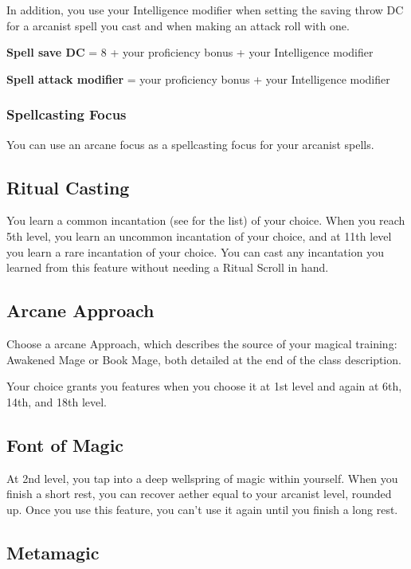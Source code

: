 In addition, you use your Intelligence modifier when setting the saving throw DC for a arcanist spell you cast and when making an attack roll with one.

\textbf{Spell save DC} = 8 + your proficiency bonus + your Intelligence modifier

\textbf{Spell attack modifier} = your proficiency bonus + your Intelligence modifier

\subsubsection{Spellcasting Focus}

You can use an arcane focus as a spellcasting focus for your arcanist spells.

\subsection{Ritual Casting}

You learn a common incantation (see  for the list) of your choice. When you reach 5th level, you learn an uncommon incantation of your choice, and at 11th level you learn a rare incantation of your choice. You can cast any incantation you learned from this feature without needing a Ritual Scroll in hand.

\subsection{Arcane Approach}

Choose a arcane Approach, which describes the source of your magical training: Awakened Mage or Book Mage, both detailed at the end of the class description.

Your choice grants you features when you choose it at 1st level and again at 6th, 14th, and 18th level.

\subsection{Font of Magic}

At 2nd level, you tap into a deep wellspring of magic within yourself. When you finish a short rest, you can recover aether equal to your arcanist level, rounded up. Once you use this feature, you can't use it again until you finish a long rest.

\subsection{Metamagic}

